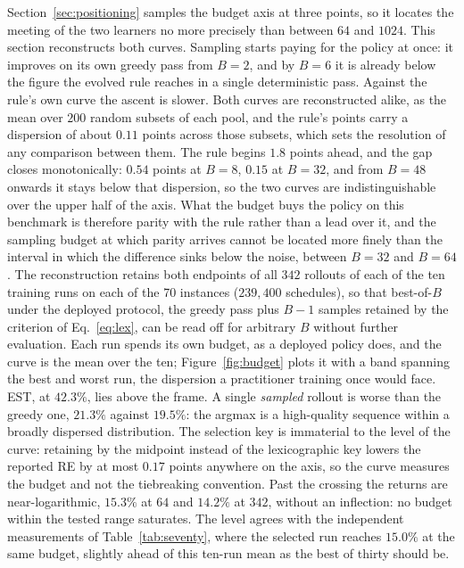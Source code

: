 \documentclass[preprint,authoryear,12pt]{elsarticle}
\theoremstyle{definition}
\theoremstyle{remark}
\begin{document}
Section~\ref{sec:positioning} samples the budget axis at three
points, so it locates the meeting of the two learners no more
precisely than between $64$ and $1024$. This section reconstructs
both curves. Sampling starts paying for the policy at once: it
improves on its own greedy pass from $B{=}2$, and by $B{=}6$ it is
already below the figure the evolved rule reaches in a single
deterministic pass. Against the rule's own curve the ascent is
slower. Both curves are reconstructed alike, as the mean over $200$
random subsets of each pool, and the rule's points carry a dispersion
of about $0.11$ points across those subsets, which sets the
resolution of any comparison between them. The rule begins $1.8$
points ahead, and the gap closes monotonically: $0.54$ points at
$B{=}8$, $0.15$ at $B{=}32$, and from $B{=}48$ onwards it stays below
that dispersion, so the two curves are indistinguishable over the
upper half of the axis. What the budget buys the policy on this
benchmark is therefore parity with the rule rather than a lead over
it, and the sampling budget at which parity arrives cannot be located
more finely than the interval in which the difference sinks below the
noise, between $B{=}32$ and $B{=}64$. The reconstruction retains
both endpoints of
all $342$ rollouts of each of the ten training runs on each of the 70
instances ($239{,}400$ schedules), so that best-of-$B$ under the
deployed protocol, the greedy pass plus $B-1$ samples retained by the
criterion of Eq.~\eqref{eq:lex}, can be read
off for arbitrary $B$ without further evaluation. Each run spends its
own budget, as a deployed policy does, and the curve is the mean over
the ten; Figure~\ref{fig:budget} plots it with a band spanning the
best and worst run, the dispersion a practitioner training once would
face. EST, at $42.3\%$, lies above the frame. A single \emph{sampled}
rollout is worse than the greedy one, $21.3\%$ against $19.5\%$: the
argmax is a high-quality sequence within a broadly dispersed
distribution. The selection key is immaterial to the level of the
curve: retaining by the midpoint instead of the lexicographic key
lowers the reported RE by at most $0.17$ points anywhere on the
axis, so the curve measures the budget and not the tiebreaking
convention. Past the crossing the returns are near-logarithmic,
$15.3\%$ at $64$ and $14.2\%$ at $342$, without an inflection: no
budget within the tested range saturates. The level agrees with the
independent measurements of Table~\ref{tab:seventy}, where the
selected run reaches $15.0\%$ at the same budget, slightly ahead of
this ten-run mean as the best of thirty should be.
\end{document}
